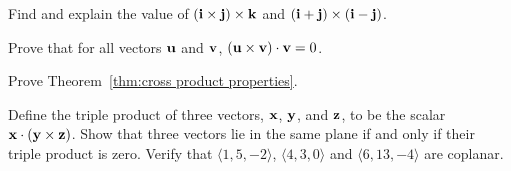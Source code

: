 \begin{enumialphparenastyle}
\begin{ex}
Find and explain the value of $({\bf i} \times {\bf j})
\times {\bf k}$ and $({\bf i} + {\bf j}) \times ({\bf i} - {\bf j})$.
\end{ex}

\begin{ex}
Prove that for all vectors ${\bf u}$ and ${\bf v}$,
$({\bf u}\times{\bf v})\cdot{\bf v}=0$.
\end{ex}

\begin{ex}
Prove Theorem~\ref{thm:cross product properties}.
\end{ex}

\begin{ex}
Define the triple product of three vectors, ${\bf x}$,
${\bf y}$, and ${\bf z}$, to be the scalar ${\bf x} \cdot ({\bf y} \times
{\bf z})$.  Show that three vectors lie in the same plane if and only if
their triple product is zero. Verify that $\langle 1, 5, -2 \rangle$,
$\langle 4, 3, 0 \rangle$ and $\langle 6, 13, -4 \rangle$ are
coplanar.
\end{ex}

\end{enumialphparenastyle}